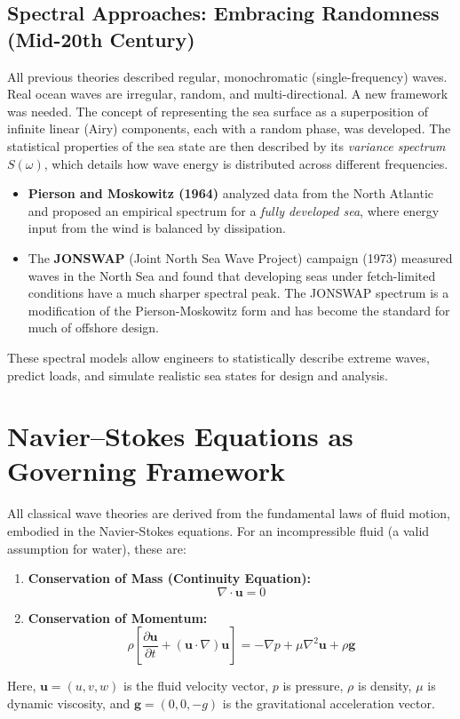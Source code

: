 \documentclass[11pt,a4paper]{article}
\begin{document}
\subsection{Spectral Approaches: Embracing Randomness (Mid-20th Century)}
All previous theories described regular, monochromatic (single-frequency) waves. Real ocean waves are irregular, random, and multi-directional. A new framework was needed. The concept of representing the sea surface as a superposition of infinite linear (Airy) components, each with a random phase, was developed. The statistical properties of the sea state are then described by its \emph{variance spectrum} $S(\omega)$, which details how wave energy is distributed across different frequencies. 
\begin{itemize}
    \item \textbf{Pierson and Moskowitz (1964)} analyzed data from the North Atlantic and proposed an empirical spectrum for a \emph{fully developed sea}, where energy input from the wind is balanced by dissipation.
    \item The \textbf{JONSWAP} (Joint North Sea Wave Project) campaign (1973) measured waves in the North Sea and found that developing seas under fetch-limited conditions have a much sharper spectral peak. The JONSWAP spectrum is a modification of the Pierson-Moskowitz form and has become the standard for much of offshore design.
\end{itemize}
These spectral models allow engineers to statistically describe extreme waves, predict loads, and simulate realistic sea states for design and analysis.

\section{Navier–Stokes Equations as Governing Framework}
All classical wave theories are derived from the fundamental laws of fluid motion, embodied in the Navier-Stokes equations. For an incompressible fluid (a valid assumption for water), these are:
\begin{enumerate}
    \item \textbf{Conservation of Mass (Continuity Equation):}
        \begin{equation}
        \nabla \cdot \mathbf{u} = 0
        \label{eq:continuity}
        \end{equation}
    \item \textbf{Conservation of Momentum:}
        \begin{equation}
        \rho \left[ \frac{\partial \mathbf{u}}{\partial t} + (\mathbf{u} \cdot \nabla) \mathbf{u} \right] = -\nabla p + \mu \nabla^2 \mathbf{u} + \rho \mathbf{g}
        \label{eq:navierstokes}
        \end{equation}
\end{enumerate}
Here, $\mathbf{u} = (u, v, w)$ is the fluid velocity vector, $p$ is pressure, $\rho$ is density, $\mu$ is dynamic viscosity, and $\mathbf{g} = (0, 0, -g)$ is the gravitational acceleration vector.
\end{document}
